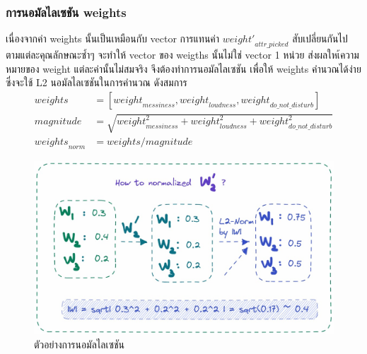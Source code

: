 \subsubsection{การนอมัลไลเซชัน weights} 
เนื่องจากค่า weights นั้นเป็นเหมือนกับ vector การแทนค่า $\mathit{weight'}_\mathit{attr\_picked}$ สับเปลี่ยนกันไปตามแต่ละคุณลักษณะซ้ำๆ 
จะทำให้ vector ของ weigths นั้นไม่ใช่ vector 1 หน่วย ส่งผลใหเ้ความหมายของ weight แต่ละค่านั้นไม่สมจริง จึงต้องทำการนอมัลไลเซชัน
เพื่อให้ weights คำนวณได้ง่าย ซึ่งจะใช้ L2 นอมัลไลเซชันในการคำนวณ ดังสมการ
\begin{align}
  \mathit{weights} &= [\mathit{weight}_\mathit{messiness}, \mathit{weight}_\mathit{loudness}, \mathit{weight}_\mathit{do\_not\_disturb}] \\
  \mathit{magnitude} &= \sqrt{\mathit{weight}_\mathit{messiness}^2 + \mathit{weight}_\mathit{loudness}^2 + \mathit{weight}_\mathit{do\_not\_disturb}^2} \\
  \mathit{weights}_\mathit{norm} &= \mathit{weights} / \mathit{magnitude}
\end{align}

\begin{figure}[h]
  \begin{center}
    \includegraphics[width=\linewidth]{photo/diagram/weight_norm.jpeg}
  \end{center}
  \caption{ตัวอย่างการนอมัลไลเซชัน}
  \label{fig:weight-norm}
\end{figure}

